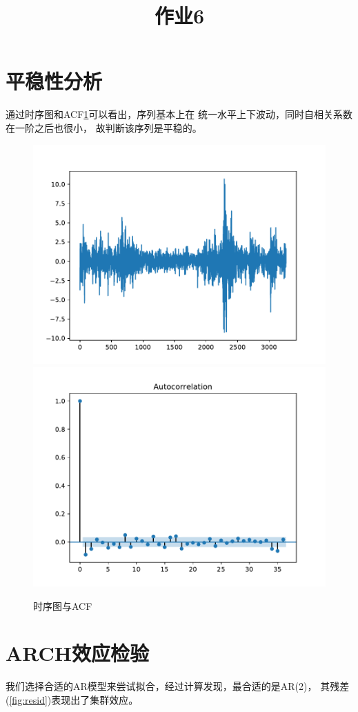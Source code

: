 \documentclass[cn]{homework}
\title{作业6}
\begin{document}
    \maketitle

    \section{平稳性分析}
    通过时序图和ACF\cref{fig:plot acf}可以看出，序列基本上在
    统一水平上下波动，同时自相关系数在一阶之后也很小，
    故判断该序列是平稳的。
    
    \begin{figure}[h]
        \includegraphics[width=0.47\linewidth]{time-series}
        \includegraphics[width=0.47\linewidth]{acf}
        \caption{时序图与ACF}
        \label{fig:plot acf}
    \end{figure}

    \section{ARCH效应检验}
    我们选择合适的AR模型来尝试拟合，经过计算发现，最合适的是AR(2)，
    其残差(\cref{fig:resid})表现出了集群效应。
\end{document}

